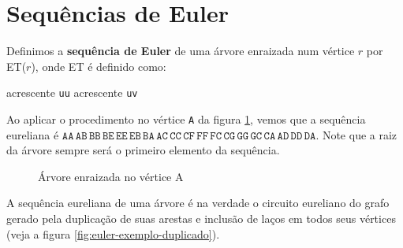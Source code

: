 \section{Sequências de Euler}
\label{sec:sequencia-euler}

Definimos a \textbf{sequência de Euler} de uma árvore enraizada num vértice $r$ por ET($r$), onde ET é definido como:

\begin{algorithmic}[H]
    \State acrescente \texttt{uu}
        \State acrescente \texttt{uv}
            \State {}
        \EndIf
    \EndFor
\EndFunction
\end{algorithmic}

Ao aplicar o procedimento no vértice \texttt{A} da figura \ref{fig:euler-exemplo}, vemos que a sequência eureliana é $\mathtt{AA\,AB\,BB\,BE\,EE\,EB\,BA\,AC\,CC\,CF\,FF\,FC\,CG\,GG\,GC\,CA\,AD\,DD\,DA}$. Note que a raiz da árvore sempre será o primeiro elemento da sequência.

\begin{figure}[H]
    \caption{Árvore enraizada no vértice A}
    \label{fig:euler-exemplo}
        \centering
\end{figure}

A sequência eureliana de uma árvore é na verdade o circuito eureliano do grafo gerado pela duplicação de suas arestas e inclusão de laços em todos seus vértices (veja a figura \ref{fig:euler-exemplo-duplicado}).

